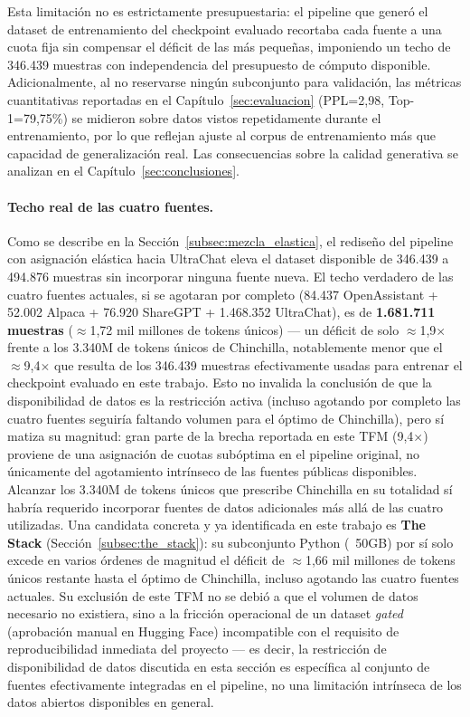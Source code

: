Esta limitación no es estrictamente presupuestaria: el pipeline que generó el dataset de entrenamiento del checkpoint evaluado recortaba cada fuente a una cuota fija sin compensar el déficit de las más pequeñas, imponiendo un techo de 346.439 muestras con independencia del presupuesto de cómputo disponible. Adicionalmente, al no reservarse ningún subconjunto para validación, las métricas cuantitativas reportadas en el Capítulo~\ref{sec:evaluacion} (PPL=2,98, Top-1=79,75\%) se midieron sobre datos vistos repetidamente durante el entrenamiento, por lo que reflejan ajuste al corpus de entrenamiento más que capacidad de generalización real. Las consecuencias sobre la calidad generativa se analizan en el Capítulo~\ref{sec:conclusiones}.

\paragraph{Techo real de las cuatro fuentes.} Como se describe en la Sección~\ref{subsec:mezcla_elastica}, el rediseño del pipeline con asignación elástica hacia UltraChat eleva el dataset disponible de 346.439 a 494.876 muestras sin incorporar ninguna fuente nueva. El techo verdadero de las cuatro fuentes actuales, si se agotaran por completo (84.437 OpenAssistant + 52.002 Alpaca + 76.920 ShareGPT + 1.468.352 UltraChat), es de \textbf{1.681.711 muestras} ($\approx$1,72 mil millones de tokens únicos) --- un déficit de solo $\approx$1,9$\times$ frente a los 3.340M de tokens únicos de Chinchilla, notablemente menor que el $\approx$9,4$\times$ que resulta de los 346.439 muestras efectivamente usadas para entrenar el checkpoint evaluado en este trabajo. Esto no invalida la conclusión de que la disponibilidad de datos es la restricción activa (incluso agotando por completo las cuatro fuentes seguiría faltando volumen para el óptimo de Chinchilla), pero sí matiza su magnitud: gran parte de la brecha reportada en este TFM (9,4$\times$) proviene de una asignación de cuotas subóptima en el pipeline original, no únicamente del agotamiento intrínseco de las fuentes públicas disponibles. Alcanzar los 3.340M de tokens únicos que prescribe Chinchilla en su totalidad sí habría requerido incorporar fuentes de datos adicionales más allá de las cuatro utilizadas. Una candidata concreta y ya identificada en este trabajo es \textbf{The Stack} (Sección~\ref{subsec:the_stack}): su subconjunto Python (~50GB) por sí solo excede en varios órdenes de magnitud el déficit de $\approx$1,66 mil millones de tokens únicos restante hasta el óptimo de Chinchilla, incluso agotando las cuatro fuentes actuales. Su exclusión de este TFM no se debió a que el volumen de datos necesario no existiera, sino a la fricción operacional de un dataset \textit{gated} (aprobación manual en Hugging Face) incompatible con el requisito de reproducibilidad inmediata del proyecto --- es decir, la restricción de disponibilidad de datos discutida en esta sección es específica al conjunto de fuentes efectivamente integradas en el pipeline, no una limitación intrínseca de los datos abiertos disponibles en general.

